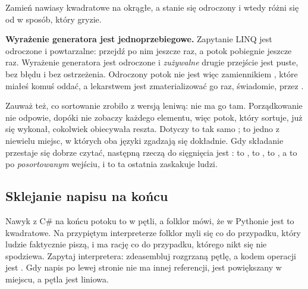 
\noindent
Zamień nawiasy kwadratowe na okrągłe, a stanie się odroczony \dash{} i
wtedy różni się od  w sposób, który gryzie.




\begin{trapbox}
\textbf{Wyrażenie generatora jest jednoprzebiegowe.} Zapytanie LINQ jest
odroczone i powtarzalne: przejdź po nim jeszcze raz, a potok pobiegnie
jeszcze raz. Wyrażenie generatora jest odroczone i \emph{zużywalne} \dash{}
drugie przejście jest puste, bez błędu i bez ostrzeżenia. Odroczony potok
nie jest więc zamiennikiem , które miałeś komuś oddać, a
lekarstwem jest zmaterializować go raz, świadomie, przez .
\end{trapbox}

\noindent
Zauważ też, co sortowanie zrobiło z wersją leniwą: nie ma go tam.
Porządkowanie nie odpowie, dopóki nie zobaczy każdego elementu, więc potok,
który sortuje, już się wykonał, cokolwiek obiecywała reszta. Dotyczy to tak
samo ; to jedno z niewielu miejsc, w których oba języki zgadzają
się dokładnie. Gdy składanie przestaje się dobrze czytać, następną rzeczą do
sięgnięcia jest :  to ,
 to ,  to , a
 to  po \emph{posortowanym} wejściu, i to ta
ostatnia zaskakuje ludzi.

\subsection{Sklejanie napisu na końcu}
\label{sec:ch05-join}

Nawyk z C\# na końcu potoku to \code{+=} w pętli, a folklor mówi, że w
Pythonie jest to kwadratowe. Na przypiętym interpreterze folklor myli się co
do przypadku, który ludzie faktycznie piszą, i ma rację co do przypadku,
którego nikt się nie spodziewa. Zapytaj interpretera: zdeasembluj rozgrzaną
pętlę, a kodem operacji jest . Gdy napis
po lewej stronie nie ma innej referencji, jest powiększany w miejscu, a
pętla jest liniowa.


